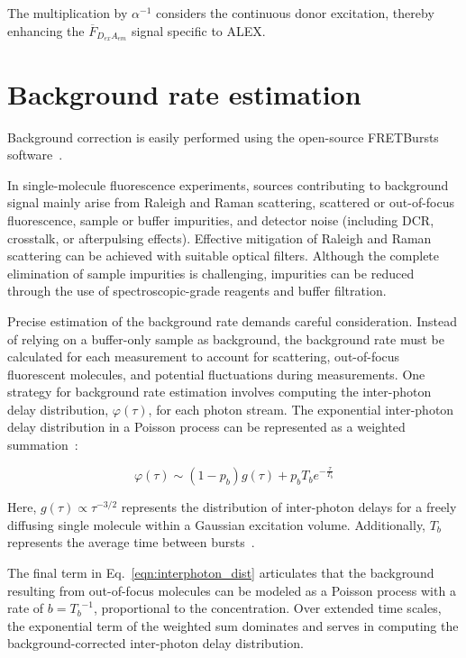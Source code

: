 The multiplication by $\alpha^{-1}$ considers the continuous donor excitation, thereby enhancing the $\overline{F}_{D_{ex}A_{em}}$ signal specific to \ac{ALEX}.


\section{Background rate estimation}
\label{sec:background_rate_apdx}

Background correction is easily performed using the open-source FRETBursts software~\cite{ingargiola_PLOS1_2016}.

In single-molecule fluorescence experiments, sources contributing to background signal mainly arise from Raleigh and Raman scattering, scattered or out-of-focus fluorescence, sample or buffer impurities, and detector noise (including \ac{DCR}, crosstalk, or afterpulsing effects). 
Effective mitigation of Raleigh and Raman scattering can be achieved with suitable optical filters. 
Although the complete elimination of sample impurities is challenging, impurities can be reduced through the use of spectroscopic-grade reagents and buffer filtration.

Precise estimation of the background rate demands careful consideration. Instead of relying on a buffer-only sample as background, the background rate must be calculated for each measurement to account for scattering, out-of-focus fluorescent molecules, and potential fluctuations during measurements. 
One strategy for background rate estimation involves computing the inter-photon delay distribution, $\varphi(\tau)$, for each photon stream. 
The exponential inter-photon delay distribution in a Poisson process can be represented as a weighted summation~\cite{gopich_JCP_2006}:

\begin{equation}
\label{eqn:interphoton_dist}
\varphi\left(\tau\right)\sim \left(1-p_b\right)g\left(\tau\right)+p_bT_be^{-\frac{\tau}{T_b}} 
\end{equation}

\noindent
Here, $g(\tau) \propto \tau^{-3/2}$ represents the distribution of inter-photon delays for a freely diffusing single molecule within a Gaussian excitation volume. 
Additionally, $T_b$ represents the average time between bursts~\cite{gopich_JCP_2006}.

The final term in Eq.~\ref{eqn:interphoton_dist} articulates that the background resulting from out-of-focus molecules can be modeled as a Poisson process with a rate of $b={T_b}^{-1}$, proportional to the concentration. 
Over extended time scales, the exponential term of the weighted sum dominates and serves in computing the background-corrected inter-photon delay distribution.


